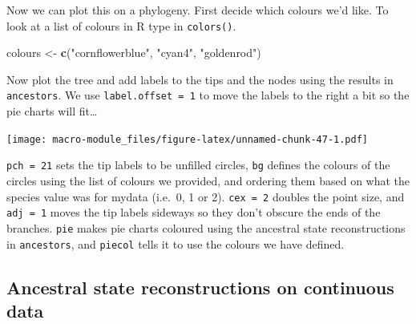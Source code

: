 \documentclass[]{book}
\newenvironment{Shaded}{\begin{snugshade}}{\end{snugshade}}
\newcommand{\KeywordTok}[1]{\textcolor[rgb]{0.13,0.29,0.53}{\textbf{{#1}}}}
\newcommand{\DataTypeTok}[1]{\textcolor[rgb]{0.13,0.29,0.53}{{#1}}}
\newcommand{\DecValTok}[1]{\textcolor[rgb]{0.00,0.00,0.81}{{#1}}}
\newcommand{\StringTok}[1]{\textcolor[rgb]{0.31,0.60,0.02}{{#1}}}
\newcommand{\NormalTok}[1]{{#1}}
\theoremstyle{definition}
\theoremstyle{definition}
\theoremstyle{definition}
\theoremstyle{remark}
\begin{document}
Now we can plot this on a phylogeny. First decide which colours we'd
like. To look at a list of colours in R type in \texttt{colors()}.

\begin{Shaded}
\begin{Highlighting}[]
\NormalTok{colours <-}\StringTok{ }\KeywordTok{c}\NormalTok{(}\StringTok{"cornflowerblue"}\NormalTok{, }\StringTok{"cyan4"}\NormalTok{, }\StringTok{"goldenrod"}\NormalTok{)}
\end{Highlighting}
\end{Shaded}

Now plot the tree and add labels to the tips and the nodes using the
results in \texttt{ancestors}. We use \texttt{label.offset\ =\ 1} to
move the labels to the right a bit so the pie charts will fit\ldots{}

\begin{Shaded}
\end{Shaded}

\texttt{[image: macro-module\_files/figure-latex/unnamed-chunk-47-1.pdf]}

\texttt{pch\ =\ 21} sets the tip labels to be unfilled circles,
\texttt{bg} defines the colours of the circles using the list of colours
we provided, and ordering them based on what the species value was for
mydata (i.e.~0, 1 or 2). \texttt{cex\ =\ 2} doubles the point size, and
\texttt{adj\ =\ 1} moves the tip labels sideways so they don't obscure
the ends of the branches. \texttt{pie} makes pie charts coloured using
the ancestral state reconstructions in \texttt{ancestors}, and
\texttt{piecol} tells it to use the colours we have defined.

\subsection{Ancestral state reconstructions on continuous
data}\label{ancestral-state-reconstructions-on-continuous-data}
\end{document}
